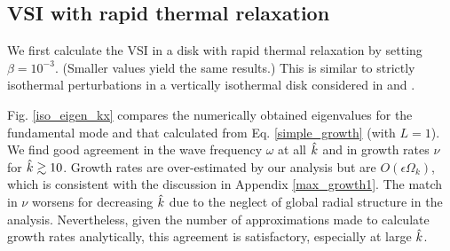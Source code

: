 \subsection{VSI with rapid thermal relaxation}\label{vertiso_pertiso} 
We first calculate the VSI in a disk with rapid thermal relaxation by
setting $\beta=10^{-3}$. (Smaller values yield the same results.) This
is similar to strictly isothermal perturbations in a vertically
isothermal disk considered in \cite{nelson13} and \cite{mcnally14}. %

Fig. \ref{iso_eigen_kx} compares the numerically obtained eigenvalues 
for the fundamental mode and that calculated from 
Eq. \ref{simple_growth} (with $L=1$). We find good agreement in the
wave frequency $\omega$ at all $\hat{k}$ and in growth rates $\nu$ for
$\hat{k}\gtrsim 10$. Growth rates are over-estimated by our analysis but 
are $O(\epsilon\Omega_k)$, which is consistent with the discussion in
Appendix \ref{max_growth1}. The match in $\nu$ worsens for
decreasing $\hat{k}$ due to the neglect of global radial structure in
the analysis. Nevertheless, given the number of approximations made
to calculate growth rates analytically, this agreement is
satisfactory, especially at large $\hat{k}$.   

